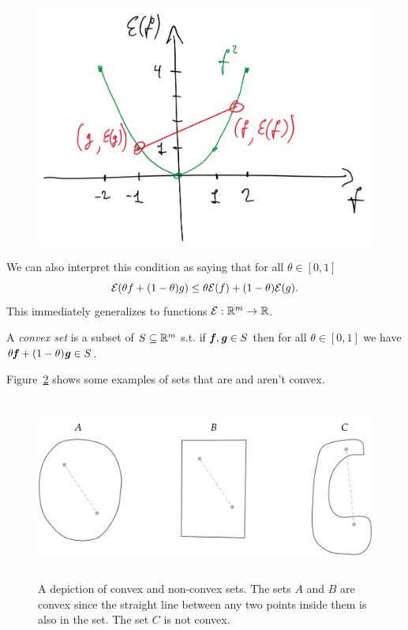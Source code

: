 \begin{figure}[H]
  \centering
  \includegraphics[width=0.6\linewidth]{fig/lecture1_flow-vs-energy-convex.png}
  \label{fig:flow-vs-energy-convex}
\end{figure}
We can also interpret this condition as saying that for all $\theta \in [0,1]$
\[
  \mathcal{E}(\theta f + (1-\theta)g) \leq \theta \mathcal{E}(f) +
  (1-\theta) \mathcal{E}(g)
  .
  \]
This immediately generalizes to functions $\mathcal{E}:\mathbb{R}^m \to \mathbb{R}$.

A \emph{convex set} is a subset of $S \subseteq \mathbb{R}^m$ s.t.
if $\boldsymbol{\mathit{f}}, \boldsymbol{\mathit{g}} \in S$ then for all $\theta \in [0,1]$ we have
$\theta \boldsymbol{\mathit{f}} + (1-\theta) \boldsymbol{\mathit{g}} \in S$.

Figure~\ref{fig:convex_sets} shows some examples of sets that are and
aren't convex.

\begin{figure}[t]
\begin{centering}
                \includegraphics[trim = 0mm 0mm 0mm 0mm, height=60mm]{fig/lec1_convex_sets.pdf}
                 \caption{A depiction of convex and non-convex sets.  The sets $A$ and $B$ are convex since the straight line between any two points inside them is also in the set.  The set $C$ is not convex.}\label{fig:convex_sets}
                 \end{centering}
\end{figure}


